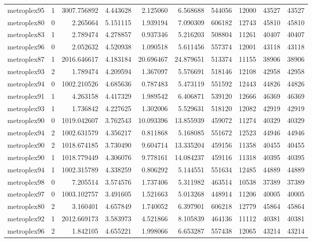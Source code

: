 \begin{longtable}{|l|r|r|r|r|r|r|r|r|r|}
metroplex95 & 1 & 3007.756892 & 4.443628 & 2.125060 & 6.568688 & 544056 & 12000 & 43527 & 43527 \\
metroplex80 & 0 & 2.265664 & 5.151115 & 1.939194 & 7.090309 & 606182 & 12743 & 45810 & 45810 \\
metroplex83 & 1 & 2.789474 & 4.278857 & 0.937346 & 5.216203 & 508804 & 11261 & 40407 & 40407 \\
metroplex96 & 0 & 2.052632 & 4.520938 & 1.090518 & 5.611456 & 557374 & 12001 & 43118 & 43118 \\
metroplex87 & 1 & 2016.646617 & 4.183184 & 20.696467 & 24.879651 & 513374 & 11155 & 38906 & 38906 \\
metroplex93 & 2 & 1.789474 & 4.209594 & 1.367097 & 5.576691 & 518146 & 12108 & 42958 & 42958 \\
metroplex94 & 0 & 1002.210526 & 4.685636 & 0.787483 & 5.473119 & 551592 & 12443 & 44826 & 44826 \\
metroplex91 & 1 & 4.263158 & 4.417329 & 1.989542 & 6.406871 & 539120 & 12666 & 46369 & 46369 \\
metroplex93 & 1 & 1.736842 & 4.227625 & 1.302006 & 5.529631 & 518120 & 12082 & 42919 & 42919 \\
metroplex90 & 0 & 1019.042607 & 3.762543 & 10.093396 & 13.855939 & 459072 & 11274 & 40329 & 40329 \\
metroplex94 & 2 & 1002.631579 & 4.356217 & 0.811868 & 5.168085 & 551672 & 12523 & 44946 & 44946 \\
metroplex90 & 2 & 1018.674185 & 3.730490 & 9.604714 & 13.335204 & 459156 & 11358 & 40455 & 40455 \\
metroplex90 & 1 & 1018.779449 & 4.306076 & 9.778161 & 14.084237 & 459116 & 11318 & 40395 & 40395 \\
metroplex94 & 1 & 1002.315789 & 4.338259 & 0.806292 & 5.144551 & 551634 & 12485 & 44889 & 44889 \\
metroplex98 & 0 & 7.205514 & 3.574576 & 1.737406 & 5.311982 & 463514 & 10538 & 37389 & 37389 \\
metroplex97 & 0 & 1003.102757 & 3.491605 & 1.521663 & 5.013268 & 448914 & 11206 & 40005 & 40005 \\
metroplex80 & 2 & 3.160401 & 4.657849 & 1.740052 & 6.397901 & 606218 & 12779 & 45864 & 45864 \\
metroplex92 & 1 & 2012.669173 & 3.583973 & 4.521866 & 8.105839 & 464136 & 11112 & 40381 & 40381 \\
metroplex96 & 2 & 1.842105 & 4.655221 & 1.998066 & 6.653287 & 557438 & 12065 & 43214 & 43214 \\

\end{longtable}
